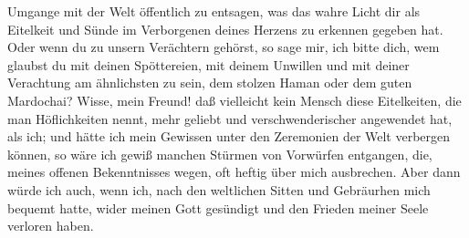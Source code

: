 Umgange mit der Welt öffentlich zu entsagen, was das wahre Licht dir als
Eitelkeit und Sünde im Verborgenen deines Herzens zu erkennen gegeben hat. Oder
wenn du zu unsern Verächtern gehörst, so sage mir, ich bitte dich, wem glaubst
du mit deinen Spöttereien, mit deinem Unwillen und mit deiner Verachtung am
ähnlichsten zu sein, dem stolzen Haman oder dem guten Mardochai? Wisse, mein
Freund! daß vielleicht kein Mensch diese Eitelkeiten, die man Höflichkeiten
nennt, mehr geliebt und verschwenderischer angewendet hat, als ich; und hätte
ich mein Gewissen unter den Zeremonien der Welt verbergen können, so wäre ich
gewiß manchen Stürmen von Vorwürfen entgangen, die, meines offenen Bekenntnisses
wegen, oft heftig über mich ausbrechen. Aber dann würde ich auch, wenn ich, nach
den weltlichen Sitten und Gebräurhen mich bequemt hatte, wider meinen Gott
gesündigt und den Frieden meiner Seele verloren haben.

\medskip

